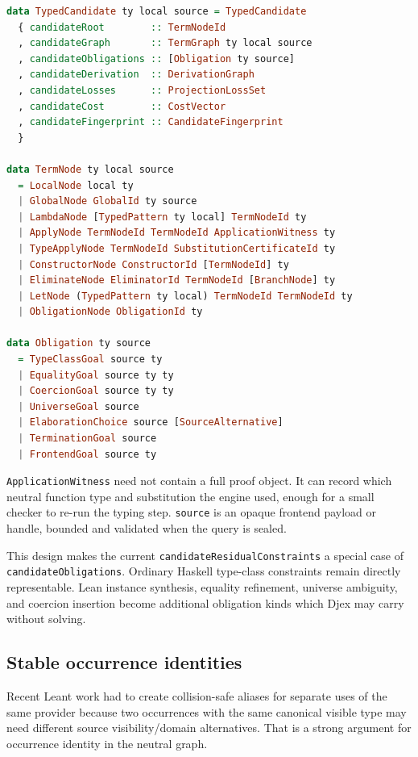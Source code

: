 \documentclass[11pt]{article}
\newcommand{\code}[1]{\texttt{#1}}
\newcommand{\Djex}{\textsf{Djex}}
\newcommand{\Leant}{\textsf{Leant}}
\begin{document}
\begin{lstlisting}[language=Haskell,caption={Sketch of a typed candidate envelope.}]
data TypedCandidate ty local source = TypedCandidate
  { candidateRoot        :: TermNodeId
  , candidateGraph       :: TermGraph ty local source
  , candidateObligations :: [Obligation ty source]
  , candidateDerivation  :: DerivationGraph
  , candidateLosses      :: ProjectionLossSet
  , candidateCost        :: CostVector
  , candidateFingerprint :: CandidateFingerprint
  }

data TermNode ty local source
  = LocalNode local ty
  | GlobalNode GlobalId ty source
  | LambdaNode [TypedPattern ty local] TermNodeId ty
  | ApplyNode TermNodeId TermNodeId ApplicationWitness ty
  | TypeApplyNode TermNodeId SubstitutionCertificateId ty
  | ConstructorNode ConstructorId [TermNodeId] ty
  | EliminateNode EliminatorId TermNodeId [BranchNode] ty
  | LetNode (TypedPattern ty local) TermNodeId TermNodeId ty
  | ObligationNode ObligationId ty

data Obligation ty source
  = TypeClassGoal source ty
  | EqualityGoal source ty ty
  | CoercionGoal source ty ty
  | UniverseGoal source
  | ElaborationChoice source [SourceAlternative]
  | TerminationGoal source
  | FrontendGoal source ty
\end{lstlisting}

\code{ApplicationWitness} need not contain a full proof object.  It can record
which neutral function type and substitution the engine used, enough for a
small checker to re-run the typing step.  \code{source} is an opaque frontend
payload or handle, bounded and validated when the query is sealed.

This design makes the current \code{candidateResidualConstraints} a special
case of \code{candidateObligations}.  Ordinary Haskell type-class constraints
remain directly representable.  Lean instance synthesis, equality refinement,
universe ambiguity, and coercion insertion become additional obligation kinds
which \Djex{} may carry without solving.

\subsection{Stable occurrence identities}

Recent \Leant{} work had to create collision-safe aliases for separate uses of
the same provider because two occurrences with the same canonical visible type
may need different source visibility/domain alternatives.  That is a strong
argument for occurrence identity in the neutral graph.
\end{document}
